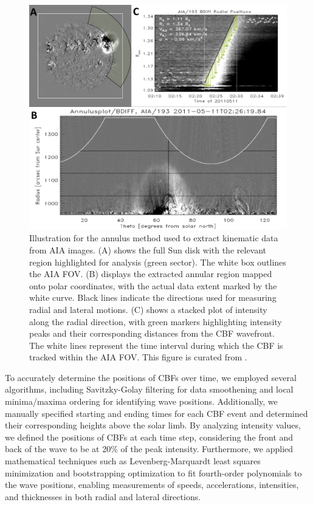 \begin{figure}[!htp] %
	\centerline{\includegraphics[width=0.9\columnwidth]{chapter2/figs/fig_annplot.pdf}}
	\caption{Illustration for the annulus method used to extract kinematic data from AIA images. (A) shows the full Sun disk with the relevant region highlighted for analysis (green sector). The white box outlines the AIA FOV. (B) displays the extracted annular region mapped onto polar coordinates, with the actual data extent marked by the white curve. Black lines indicate the directions used for measuring radial and lateral motions. (C) shows a stacked plot of intensity along the radial direction, with green markers highlighting intensity peaks and their corresponding distances from the CBF wavefront. The white lines represent the time interval during which the CBF is tracked within the AIA FOV. This figure is curated from \citep{kozarev_2017}.}
	\label{fig_annplot}
\end{figure}

To accurately determine the positions of CBFs over time, we employed several algorithms, including Savitzky-Golay filtering \citep{savitzky_1964} for data smoothening and local minima/maxima ordering for identifying wave positions. Additionally, we manually specified starting and ending times for each CBF event and determined their corresponding heights above the solar limb.
By analyzing intensity values, we defined the positions of CBFs at each time step, considering the front and back of the wave to be at 20\% of the peak intensity. Furthermore, we applied mathematical techniques such as Levenberg-Marquardt least squares minimization \citep{markwardt_2009} and bootstrapping optimization \citep{efron_1979} to fit fourth-order polynomials to the wave positions, enabling measurements of speeds, accelerations, intensities, and thicknesses in both radial and lateral directions.

